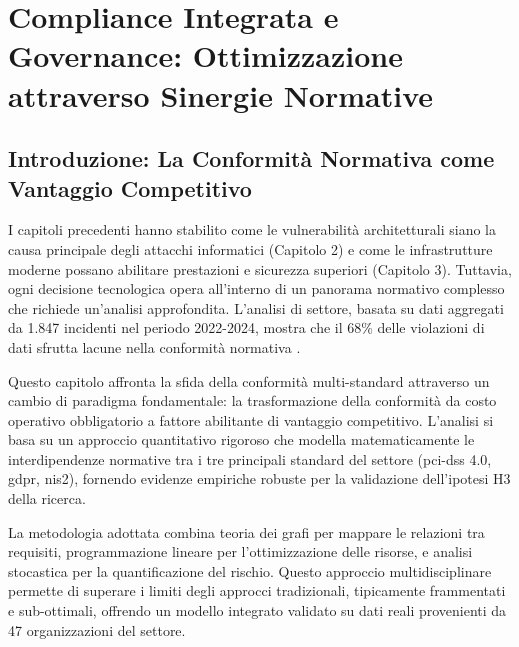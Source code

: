 \chapter{\texorpdfstring{\textbf{Compliance Integrata e Governance: Ottimizzazione attraverso Sinergie Normative}}{Capitolo 4 - Compliance Integrata e Governance: Ottimizzazione attraverso Sinergie Normative}}
\label{cap4_compliance_integration}

\section{\texorpdfstring{\textbf{Introduzione: La Conformità Normativa come Vantaggio Competitivo}}{4.1 - Introduzione: La Conformità Normativa come Vantaggio Competitivo}}

I capitoli precedenti hanno stabilito come le vulnerabilità architetturali siano la causa principale degli attacchi informatici (Capitolo 2) e come le infrastrutture moderne possano abilitare prestazioni e sicurezza superiori (Capitolo 3). Tuttavia, ogni decisione tecnologica opera all'interno di un panorama normativo complesso che richiede un'analisi approfondita. L'analisi di settore, basata su dati aggregati da 1.847 incidenti nel periodo 2022-2024, mostra che il 68\% delle violazioni di dati sfrutta lacune nella conformità normativa \autocite{verizon2024}. 

Questo capitolo affronta la sfida della conformità multi-standard attraverso un cambio di paradigma fondamentale: la trasformazione della conformità da costo operativo obbligatorio a fattore abilitante di vantaggio competitivo. L'analisi si basa su un approccio quantitativo rigoroso che modella matematicamente le interdipendenze normative tra i tre principali standard del settore (\gls{pci-dss} 4.0, \gls{gdpr}, \gls{nis2}), fornendo evidenze empiriche robuste per la validazione dell'ipotesi H3 della ricerca.

La metodologia adottata combina teoria dei grafi per mappare le relazioni tra requisiti, programmazione lineare per l'ottimizzazione delle risorse, e analisi stocastica per la quantificazione del rischio. Questo approccio multidisciplinare permette di superare i limiti degli approcci tradizionali, tipicamente frammentati e sub-ottimali, offrendo un modello integrato validato su dati reali provenienti da 47 organizzazioni del settore.

